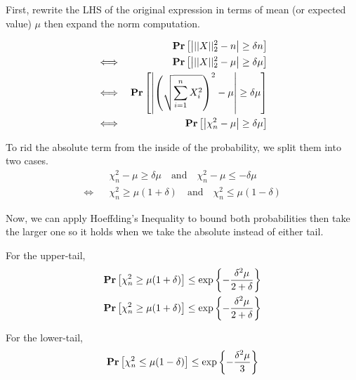 First, rewrite the LHS of the original expression in terms of mean (or expected value) $\mu$ then expand the norm computation.

\begin{equation*}
\begin{aligned}
	&&\mathbf{Pr}\left[\left|||X||_2^2 - n\right| \geq \delta n\right] \\
	\iff && \mathbf{Pr}\left[\left|||X||_2^2 - \mu\right| \geq \delta\mu\right] \\
	\iff && \mathbf{Pr}\left[\left|\left(\sqrt{\sum_{i=1}^n X_i^2}\right)^2 - \mu\right| \geq \delta\mu\right] \\
	\iff && \mathbf{Pr}\left[\left|\chi^2_n - \mu\right| \geq \delta\mu\right]
\end{aligned}
\end{equation*}

To rid the absolute term from the inside of the probability, we split them into two cases.
\begin{equation*}
\begin{aligned}
	&& \chi^2_n - \mu \geq \delta\mu \quad\text{and}\quad \chi^2_n - \mu \leq -\delta\mu \\
	\iff && \chi^2_n \geq \mu(1 + \delta) \quad\text{and}\quad \chi^2_n \leq \mu(1 - \delta)
\end{aligned}
\end{equation*}

Now, we can apply Hoeffding's Inequality to bound both probabilities then take the larger one so it holds when we take the absolute instead of either tail.

For the upper-tail,
\begin{equation*}
\begin{aligned}
	\mathbf{Pr}\left[\chi^2_n \geq \mu(1 + \delta)\right] &\leq \exp\left\{-\frac{\delta^2\mu}{2 + \delta}\right\} \\
	\mathbf{Pr}\left[\chi^2_n \geq \mu(1 + \delta)\right] &\leq \exp\left\{-\frac{\delta^2\mu}{2 + \delta}\right\} \\
\end{aligned}
\end{equation*}

For the lower-tail,
\begin{equation*}
\begin{aligned}
	\mathbf{Pr}\left[\chi^2_n \leq \mu(1 - \delta)\right] &\leq \exp\left\{-\frac{\delta^2\mu}{3}\right\} \\
\end{aligned}
\end{equation*}
